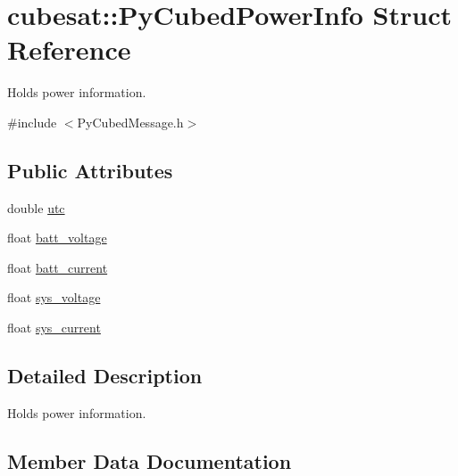 \hypertarget{structcubesat_1_1PyCubedPowerInfo}{}\section{cubesat\+:\+:Py\+Cubed\+Power\+Info Struct Reference}
\label{structcubesat_1_1PyCubedPowerInfo}


Holds power information.  




{\ttfamily \#include $<$Py\+Cubed\+Message.\+h$>$}

\subsection*{Public Attributes}
\begin{DoxyCompactItemize}
\item 
double \hyperlink{structcubesat_1_1PyCubedPowerInfo_a996ed40659fdb6b6839be93c41916823}{utc}
\item 
float \hyperlink{structcubesat_1_1PyCubedPowerInfo_ac55dcd441743ca47a9c0f928f9786a04}{batt\+\_\+voltage}
\item 
float \hyperlink{structcubesat_1_1PyCubedPowerInfo_a1982f742645b1901fdc1fe3ce655f3cf}{batt\+\_\+current}
\item 
float \hyperlink{structcubesat_1_1PyCubedPowerInfo_a7ed9543532030de641e198378f1eca8c}{sys\+\_\+voltage}
\item 
float \hyperlink{structcubesat_1_1PyCubedPowerInfo_ad424fe069fc2306e899192f1a8a95a3a}{sys\+\_\+current}
\end{DoxyCompactItemize}


\subsection{Detailed Description}
Holds power information. 

\subsection{Member Data Documentation}
\mbox{\label{structcubesat_1_1PyCubedPowerInfo_a1982f742645b1901fdc1fe3ce655f3cf}} 
